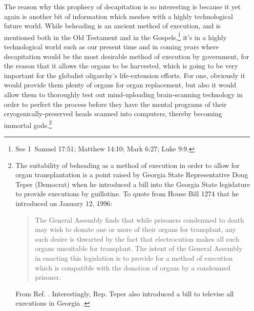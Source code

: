 \documentclass[letterpaper,12pt]{article}
\begin{document}
The reason why this prophecy of decapitation is so interesting is because it yet again is another bit of information which meshes with a highly technological future world. While beheading is an ancient method of execution, and is mentioned both in the Old Testament and in the Gospels,\footnote{See 1~Samuel 17:51; Matthew 14:10; Mark 6:27; Luke 9:9.} it's in a highly technological world such as our present time and in coming years where decapitation would be the most desirable method of execution by government, for the reason that it allows the organs to be harvested, which is going to be very important for the globalist oligarchy's life-extension efforts. For one, obviously it would provide them plenty of organs for organ replacement, but also it would allow them to thoroughly test out mind-uploading brain-scanning technology in order to perfect the process before they have the mental programs of their cryogenically-preserved heads scanned into computers, thereby becoming immortal gods.\footnote{The suitability of beheading as a method of execution in order to allow for organ transplantation is a point raised by Georgia State Representative Doug Teper (Democrat) \cite{GeorgiaHOR1996b} when he introduced a bill into the Georgia State legislature to provide executions by guillotine. To quote from House Bill 1274 that he introduced on January 12, 1996: \begin{quote}
The General Assembly finds that while prisoners condemned to death may wish to donate one or more of their organs for transplant, any such desire is thwarted by the fact that electrocution makes all such organs unsuitable for transplant. The intent of the General Assembly in enacting this legislation is to provide for a method of execution which is compatible with the donation of organs by a condemned prisoner.
\end{quote} From Ref. . Interestingly, Rep. Teper also introduced a bill to televise all executions in Georgia \cite{GeorgiaHOR1995}.}
\end{document}
